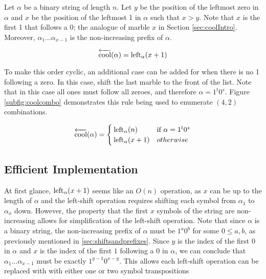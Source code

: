 Let $\alpha$ be a binary string of length $n$.
 Let $y$ be the position of the leftmost zero in $\alpha$ and $x$ be the position of the leftmost 1 in $\alpha$ such that $x > y$. Note that $x$ is the first 1 that follows a 0; the analogue of marble $x$ in Section \ref{sec:coolIntro}.  Moreover, $\alpha_1...\alpha_{x-1}$ is the non-increasing prefix of $\alpha$.


 \begin{equation} \label{eq:coolCombo}
     \overleftarrow{\text{cool}}(\alpha) = \leftshift[\alpha]{x+1}
 \end{equation}

 To make this order cyclic, an additional case can be added for when there is no 1 following a zero. In this case, shift the last marble to the front of the list. Note that in this case all ones must follow all zeroes, and therefore $\alpha=1^t0^s$.  Figure \ref{subfig:coolcombo} demonstrates this rule being used to enumerate $(4,2)$ combinations.

\begin{equation}\label{eq:coolComboCyclic}
    \overleftarrow{\text{cool}}(\alpha) = \begin{cases}
	\leftshift[\alpha]{n} & \text{if } \alpha=1^t0^s \\
	\leftshift[\alpha]{x+1} & otherwise
\end{cases}
\end{equation}




\subsection{Efficient Implementation}

At first glance, $\leftshift[\alpha]{x+1}$ seems like an $O(n)$ operation, as $x$ can be up to the length of $\alpha$ and the left-shift operation requires shifting each symbol from $\alpha_1$ to $\alpha_{x}$ down.  However, 
the property that the first $x$ symbols of the string are non-increasing allows for simplification of the left-shift operation. Note that since $\alpha$ is a binary string, the non-increasing prefix of $\alpha$ must be $1^a0^b$ for some $0 \le a,b$, as previously mentioned in \ref{sec:shiftsandprefixes}. Since $y$ is the index of the first $0$ in $\alpha$ and $x$ is the index of the first $1$ following a $0$ in $\alpha$, we can conclude that $\alpha_1...\alpha_{x-1}$ must be exactly $1^{y-1}0^{x-y}$. This allows each left-shift operation can be replaced with with either one or two symbol transpositions 

